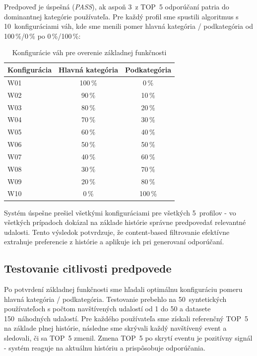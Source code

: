 \documentclass[12pt,a4paper]{article}
\begin{document}
Predpoveď je úspešná (\textit{PASS}), ak aspoň 3~z TOP~5 odporúčaní patria do
dominantnej kategórie používateľa. Pre každý profil sme spustili algoritmus
s 10~konfiguráciami váh, kde sme menili pomer hlavná kategória / podkategória
od 100\,\%/0\,\% po 0\,\%/100\,\%:

\begin{table}[H]
\centering
\begin{tabular}{|l|c|c|}
\hline
\textbf{Konfigurácia} & \textbf{Hlavná kategória} & \textbf{Podkategória} \\
\hline
W01 & 100\,\% & 0\,\%   \\
W02 & 90\,\%  & 10\,\%  \\
W03 & 80\,\%  & 20\,\%  \\
W04 & 70\,\%  & 30\,\%  \\
W05 & 60\,\%  & 40\,\%  \\
W06 & 50\,\%  & 50\,\%  \\
W07 & 40\,\%  & 60\,\%  \\
W08 & 30\,\%  & 70\,\%  \\
W09 & 20\,\%  & 80\,\%  \\
W10 & 0\,\%   & 100\,\% \\
\hline
\end{tabular}
\caption{Konfigurácie váh pre overenie základnej funkčnosti}
\label{tab:w_configs}
\end{table}

Systém úspešne prešiel všetkými konfiguráciami pre všetkých 5~profilov - vo
všetkých prípadoch dokázal na základe histórie správne predpovedať relevantné
udalosti. Tento výsledok potvrdzuje, že content-based filtrovanie efektívne
extrahuje preferencie z histórie a aplikuje ich pri generovaní odporúčaní.

\subsection{Testovanie citlivosti predpovede}

Po potvrdení základnej funkčnosti sme hľadali optimálnu konfiguráciu pomeru
hlavná kategória / podkategória. Testovanie prebehlo na 50~syntetických
používateľoch s počtom navštívených udalostí od 1 do 50 a datasete 150~náhodných
udalostí. Pre každého používateľa sme získali referenčný TOP~5 na základe plnej
histórie, následne sme skrývali každý navštívený event a sledovali, či sa TOP~5
zmenil. Zmena TOP~5 po skrytí eventu je pozitívny signál - systém reaguje na
aktuálnu históriu a prispôsobuje odporúčania.
\end{document}
